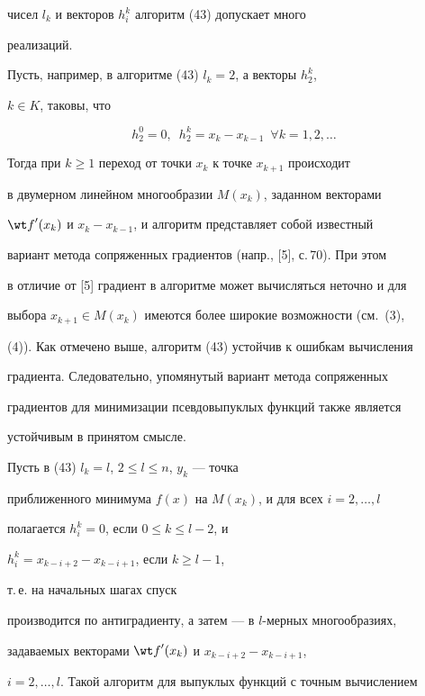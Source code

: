 чисел $l_k$ и векторов $h_i^k$ алгоритм (43) допускает много


реализаций.





Пусть, например, в алгоритме (43) $l_k=2$, а векторы $h_2^k$,


$k\in K$, таковы, что


\begin{equation}


h_2^{0}=0,\ \; h_2^k=x_k-x_{k-1}\ \;\forall k=1,2,\dotsc


\end{equation}


Тогда при $k\ge 1$ переход от точки $x_k$ к точке $x_{k+1}$ происходит


в двумерном линейном многообразии $M(x_k)$, заданном векторами


${\wt f}'(x_k)$ и $x_k-x_{k-1}$, и алгоритм представляет собой известный


вариант метода сопряженных градиентов (напр., [5], с.\,70). При этом


в отличие от [5] градиент в алгоритме может вычисляться неточно и для


выбора $x_{k+1}\in M(x_k)$ имеются более широкие возможности (см.~(3),


(4)). Как отмечено выше, алгоритм (43) устойчив к ошибкам вычисления


градиента. Следовательно, упомянутый вариант метода сопряженных


градиентов для минимизации псевдовыпуклых функций также является


устойчивым в принятом смысле.





Пусть в (43) $l_k=l$, $2\le l\le n$, $y_k$ --- точка


приближенного минимума $f(x)$ на $M(x_k)$, и для всех $i=2,\dotsc,l$


полагается $h_i^k=0$, если $0\le k\le l-2$, и


$h_i^k=x_{k-i+2}- x_{k-i+1}$, если $k\ge l-1$,


т.\,е. на начальных шагах спуск


производится по антиградиенту, а затем --- в $l$-мерных многообразиях,


задаваемых векторами ${\wt f}'(x_k)$ и $x_{k-i+2}-x_{k-i+1}$,\


$i=2,\dotsc,l$. Такой алгоритм для выпуклых функций с точным вычислением


